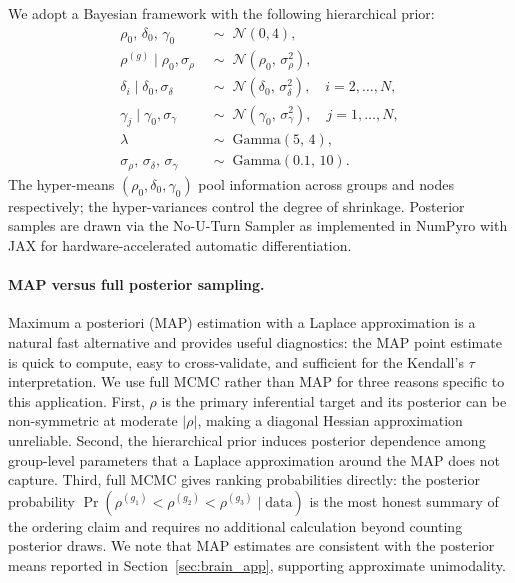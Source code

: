 \documentclass[12pt]{article}
\begin{document}
We adopt a Bayesian framework with the following hierarchical prior:
\begin{align}
\rho_0,\, \delta_0,\, \gamma_0 &\;\sim\; \mathcal{N}(0, 4), \\
\rho^{(g)} \mid \rho_0, \sigma_\rho
  &\;\sim\; \mathcal{N}(\rho_0,\, \sigma_\rho^2), \\
\delta_i \mid \delta_0, \sigma_\delta
  &\;\sim\; \mathcal{N}(\delta_0,\, \sigma_\delta^2),
  \quad i = 2,\ldots,N, \\
\gamma_j \mid \gamma_0, \sigma_\gamma
  &\;\sim\; \mathcal{N}(\gamma_0,\, \sigma_\gamma^2),
  \quad j = 1,\ldots,N, \\
\lambda &\;\sim\; \mathrm{Gamma}(5,\, 4), \\
\sigma_\rho,\, \sigma_\delta,\, \sigma_\gamma
  &\;\sim\; \mathrm{Gamma}(0.1,\, 10).
\end{align}
The hyper-means $(\rho_0, \delta_0, \gamma_0)$ pool information across
groups and nodes respectively; the hyper-variances control the degree of
shrinkage.  Posterior samples are drawn via the No-U-Turn Sampler
\citep[NUTS;][]{hoffman2014} as implemented in NumPyro \citep{phan2019} with
JAX \citep{jax2018} for hardware-accelerated automatic differentiation.

\paragraph{MAP versus full posterior sampling.}
Maximum a posteriori (MAP) estimation with a Laplace approximation is a
natural fast alternative and provides useful diagnostics: the MAP point
estimate is quick to compute, easy to cross-validate, and sufficient for
the Kendall's $\tau$ interpretation.  We use full MCMC rather than MAP for
three reasons specific to this application.  First, $\rho$ is the primary
inferential target and its posterior can be non-symmetric at moderate
$|\rho|$, making a diagonal Hessian approximation unreliable.  Second, the
hierarchical prior induces posterior dependence among group-level parameters
that a Laplace approximation around the MAP does not capture.  Third, full
MCMC gives ranking probabilities directly: the posterior probability
$\Pr(\rho^{(g_1)} < \rho^{(g_2)} < \rho^{(g_3)} \mid \mathrm{data})$ is
the most honest summary of the ordering claim and requires no additional
calculation beyond counting posterior draws.  We note that MAP estimates
are consistent with the posterior means reported in
Section~\ref{sec:brain_app}, supporting approximate unimodality.
\end{document}
